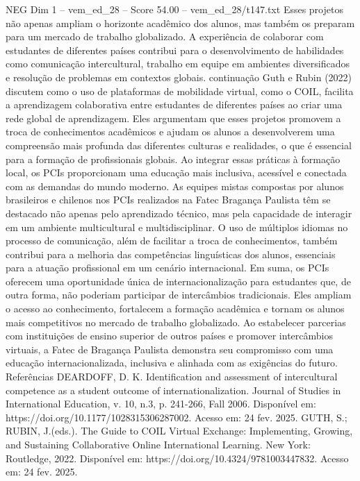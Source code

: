\begin{textsample}{NEG Dim 1 – vem\_ed\_28 – Score 54.00 – vem\_ed\_28/t147.txt}
Esses projetos não apenas ampliam o horizonte acadêmico dos alunos, mas também os preparam para um mercado de trabalho globalizado.
A experiência de colaborar com estudantes de diferentes países contribui para o desenvolvimento de habilidades como comunicação intercultural, trabalho em equipe em ambientes diversificados e resolução de problemas em contextos globais. continuação Guth e Rubin (2022) discutem como o uso de plataformas de mobilidade virtual, como o COIL, facilita a aprendizagem colaborativa entre estudantes de diferentes países ao criar uma rede global de aprendizagem.
Eles argumentam que esses projetos promovem a troca de conhecimentos acadêmicos e ajudam os alunos a desenvolverem uma compreensão mais profunda das diferentes culturas e realidades, o que é essencial para a formação de profissionais globais.
Ao integrar essas práticas à formação local, os PCIs proporcionam uma educação mais inclusiva, acessível e conectada com as demandas do mundo moderno.
As equipes mistas compostas por alunos brasileiros e chilenos nos PCIs realizados na Fatec Bragança Paulista têm se destacado não apenas pelo aprendizado técnico, mas pela capacidade de interagir em um ambiente multicultural e multidisciplinar.
O uso de múltiplos idiomas no processo de comunicação, além de facilitar a troca de conhecimentos, também contribui para a melhoria das competências linguísticas dos alunos, essenciais para a atuação profissional em um cenário internacional.
Em suma, os PCIs oferecem uma oportunidade única de internacionalização para estudantes que, de outra forma, não poderiam participar de intercâmbios tradicionais.
Eles ampliam o acesso ao conhecimento, fortalecem a formação acadêmica e tornam os alunos mais competitivos no mercado de trabalho globalizado.
Ao estabelecer parcerias com instituições de ensino superior de outros países e promover intercâmbios virtuais, a Fatec de Bragança Paulista demonstra seu compromisso com uma educação internacionalizada, inclusiva e alinhada com as exigências do futuro.
Referências DEARDOFF, D.
K.
Identification and assessment of intercultural competence as a student outcome of internationalization.
Journal of Studies in International Education, v. 10, n.3, p. 241-266, Fall 2006.
Disponível em: https://doi.org/10.1177/1028315306287002.
Acesso em: 24 fev. 2025.
GUTH, S.; RUBIN, J.(eds.).
The Guide to COIL Virtual Exchange: Implementing, Growing, and Sustaining Collaborative Online International Learning.
New York: Routledge, 2022.
Disponível em: https://doi.org/10.4324/9781003447832.
Acesso em: 24 fev. 2025.

\end{textsample}
